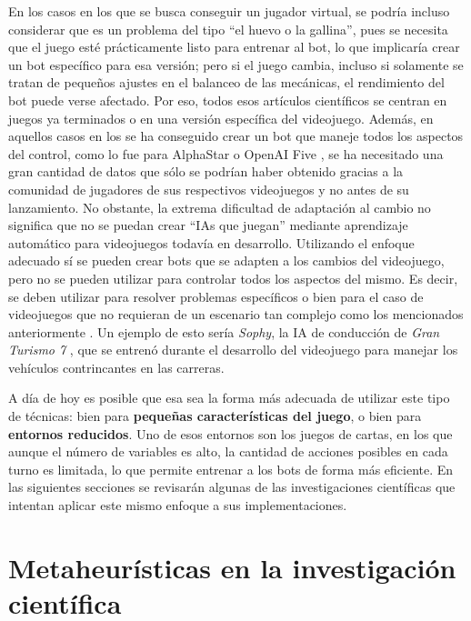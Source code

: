 En los casos en los que se busca conseguir un jugador virtual, se podría incluso considerar que es un problema del tipo ``el huevo o la gallina'', pues se necesita que el juego esté prácticamente listo para entrenar al bot, lo que implicaría crear un bot específico para esa versión; pero si el juego cambia, incluso si solamente se tratan de pequeños ajustes en el balanceo de las mecánicas, el rendimiento del bot puede verse afectado. Por eso, todos esos artículos científicos se centran en juegos ya terminados o en una versión específica del videojuego. Además, en aquellos casos en los se ha conseguido crear un bot que maneje todos los aspectos del control, como lo fue para AlphaStar \cite{vinyals_grandmaster_2019} o OpenAI Five \cite{openai_dota_2019}, se ha necesitado una gran cantidad de datos que sólo se podrían haber obtenido gracias a la comunidad de jugadores de sus respectivos videojuegos y no antes de su lanzamiento. No obstante, la extrema dificultad de adaptación al cambio no significa que no se puedan crear ``IAs que juegan'' mediante aprendizaje automático para videojuegos todavía en desarrollo. Utilizando el enfoque adecuado sí se pueden crear bots que se adapten a los cambios del videojuego, pero no se pueden utilizar para controlar todos los aspectos del mismo. Es decir, se deben utilizar para resolver problemas específicos o bien para el caso de videojuegos que no requieran de un escenario tan complejo como los mencionados anteriormente \cite{ai_and_games_why_2024}. Un ejemplo de esto sería \textit{Sophy}, la IA de conducción de \textit{Gran Turismo 7} \cite{wurman_outracing_2022}, que se entrenó durante el desarrollo del videojuego para manejar los vehículos contrincantes en las carreras.

A día de hoy es posible que esa sea la forma más adecuada de utilizar este tipo de técnicas: bien para \textbf{pequeñas características del juego}, o bien para \textbf{entornos reducidos}. Uno de esos entornos son los juegos de cartas, en los que aunque el número de variables es alto, la cantidad de acciones posibles en cada turno es limitada, lo que permite entrenar a los bots de forma más eficiente. En las siguientes secciones se revisarán algunas de las investigaciones científicas que intentan aplicar este mismo enfoque a sus implementaciones.

\section{Metaheurísticas en la investigación científica} \label{sec:estado_arte}

